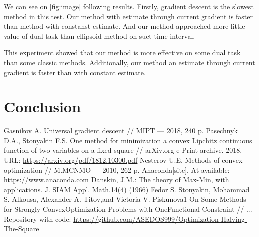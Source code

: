 \documentclass[12pt]{article}
\begin{document}
We can see on \ref{fig:image} following results. Firstly, gradient descent is the slowest method in this test. Our method with estimate through current gradient is faster than method with constanst estimate. And our method approached more little value of dual task than ellipsoid method on suct time interval.

This experiment showed that our method is more effective on some dual task than some classic methods. Additionally, our method an estimate through current gradient is faster than with constant estimate.

\section{Conclusion}
\newpage
\begin{thebibliography}{3}
Gasnikov A.  Universal gradient descent // MIPT --- 2018, 240 p.
Pasechnyk D.A., Stonyakin F.S.  One method for minimization a convex Lipchitz continuous function of two variables on a fixed square // arXiv.org e-Print archive. 2018. – URL: \href{https://arxiv.org/pdf/1812.10300.pdf}{https://arxiv.org/pdf/1812.10300.pdf}
Nesterov U.E.  Methods of convex optimization // M.MCNMO --- 2010, 262 p.
Anaconda[site]. At available: \href{https://www.anaconda.com}{https://www.anaconda.com}
Danskin, J.M.: The theory of Max-Min, with applications. J. SIAM Appl. Math.14(4) (1966)
Fedor S. Stonyakin, Mohammad S. Alkousa, Alexander A. Titov,and Victoria V. Piskunova1 On Some Methods for Strongly ConvexOptimization Problems with OneFunctional Constraint // ...
Repository with code: \href{https://github.com/ASEDOS999/Optimization-Halving-The-Square}{https://github.com/ASEDOS999/Optimization-Halving-The-Square}
\end{thebibliography}
\end{document}
